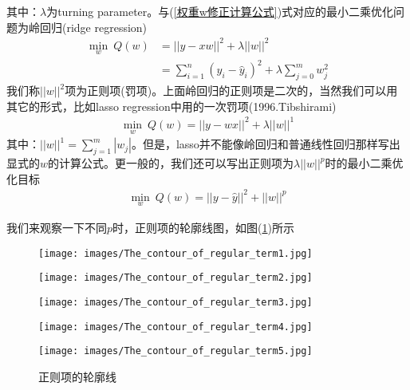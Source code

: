         其中：$\lambda$为turning parameter。与(\ref{权重w修正计算公式})式对应的最小二乘优化问题为岭回归(ridge regression)
        \begin{align*}
        \min_w\ Q(w) &= ||y - x w||^2 + \lambda ||w||^2\\
        &= \sum_{i=1}^n(y_i-\hat{y}_i)^2+\lambda\sum_{j = 0}^m w_j^2
        \end{align*}
        我们称$||w||^2$项为正则项(罚项)。上面岭回归的正则项是二次的，当然我们可以用其它的形式，比如lasso regression中用的一次罚项(1996.Tibshirami)
        \begin{align*}
        \min_w \ Q(w) = ||y  - wx||^2+\lambda||w||^1
        \end{align*}
        其中：$||w||^1 =\sum_{j=1}^m |w_j|$。但是，lasso并不能像岭回归和普通线性回归那样写出显式的$w$的计算公式。更一般的，我们还可以写出正则项为$\lambda||w||^p$时的最小二乘优化目标
        \begin{align*}
        \min_w \ Q(w) = ||y-\hat{y}||^2 + ||w||^p
        \end{align*}
        \par
        我们来观察一下不同$p$时，正则项的轮廓线图，如图(\ref{fig:正则项的轮廓线})所示
        \begin{figure}[H]
          \centering
          \begin{varwidth}[t]{\textwidth}
            \vspace{0pt}
            \texttt{[image: images/The\_contour\_of\_regular\_term1.jpg]}
          \end{varwidth}
          \begin{varwidth}[t]{\textwidth}
            \vspace{0pt}
            \texttt{[image: images/The\_contour\_of\_regular\_term2.jpg]}
          \end{varwidth}
          \begin{varwidth}[t]{\textwidth}
            \vspace{0pt}
            \texttt{[image: images/The\_contour\_of\_regular\_term3.jpg]}
          \end{varwidth}
            \begin{varwidth}[t]{\textwidth}
            \vspace{0pt}
            \texttt{[image: images/The\_contour\_of\_regular\_term4.jpg]}
          \end{varwidth}
            \begin{varwidth}[t]{\textwidth}
            \vspace{0pt}
            \texttt{[image: images/The\_contour\_of\_regular\_term5.jpg]}
          \end{varwidth}
        \caption{正则项的轮廓线}
        \label{fig:正则项的轮廓线}
        \end{figure}
